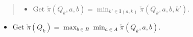 \documentclass[a4paper,10pt,english]{sphinxmanual}
\begin{document}
{\begin{minipage}{0.95\linewidth}
\begin{quote}
\begin{itemize}
\begin{quote}
\begin{quote}
\begin{itemize}
\item {} 
Solve separable BLP

\end{itemize}
\begin{gather}
\begin{split}\check{\pi}(Q_k,a,b,k') &
= \min_{\lambda \in Q_k,w} \lambda [ (1-\delta)v(a,b) + \delta P w ]
\\
s.t. &
\\
M_{k'} (\lambda P)^T & \leq d_{k'}
\\
\lambda b^T & \leq 0
\\
H w & \leq c^{o}(Q_k', \cdot)
\\
\delta[p^j(a')-p^j(a_j)]\cdot w & \leq (1-\delta) [\phi(a')-\phi(a_j)], \  \forall j \in \mathcal{Z}\end{split}\notag
\end{gather}\end{quote}
\end{quote}

\item {} 
Get \(\check{\pi}(Q_k,a,b) = \min_{k' \in \mathbf{I}(a,k)} \check{\pi}(Q_k,a,b,k')\).

\end{itemize}
\end{quote}
\begin{itemize}
\item {} 
Get \(\check{\pi}(Q_k)  = \max_{b \in B} \min_{a \in A}\check{\pi}(Q_k,a,b)\).

\end{itemize}
\end{minipage}}
\begin{center}\setlength{\fboxsep}{5pt}\end{center}

\begin{DUlineblock}{0em}
\item[] 
\end{DUlineblock}
\end{document}
